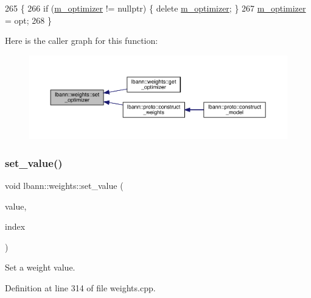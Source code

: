 \begin{DoxyCode}
265                                           \{
266   \textcolor{keywordflow}{if} (\hyperlink{classlbann_1_1weights_a5f3b4d4a3ad390c2a9bdbe6c4971de65}{m\_optimizer} != \textcolor{keyword}{nullptr}) \{ \textcolor{keyword}{delete} \hyperlink{classlbann_1_1weights_a5f3b4d4a3ad390c2a9bdbe6c4971de65}{m\_optimizer}; \}
267   \hyperlink{classlbann_1_1weights_a5f3b4d4a3ad390c2a9bdbe6c4971de65}{m\_optimizer} = opt;
268 \}
\end{DoxyCode}
Here is the caller graph for this function\+:\nopagebreak
\begin{figure}[H]
\begin{center}
\leavevmode
\includegraphics[width=350pt]{classlbann_1_1weights_ab641f66c09c8b5d491c0f262e8cb55e6_icgraph}
\end{center}
\end{figure}
\mbox{\label{classlbann_1_1weights_aaae37ad2df0808eb606609cd58cd223b}} 
\subsubsection{\texorpdfstring{set\+\_\+value()}{set\_value()}\hspace{0.1cm}{\footnotesize\ttfamily [1/3]}}
{\footnotesize\ttfamily void lbann\+::weights\+::set\+\_\+value (\begin{DoxyParamCaption}\item[{Data\+Type}]{value,  }\item[{int}]{index }\end{DoxyParamCaption})}

Set a weight value. 

Definition at line 314 of file weights.\+cpp.



